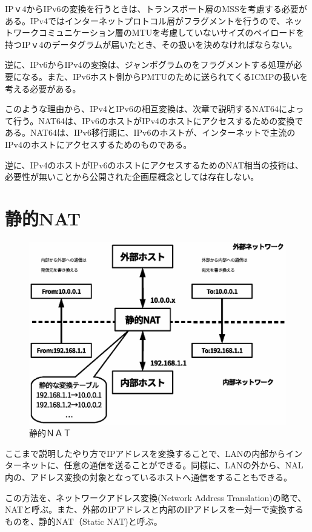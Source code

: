 IPｖ4からIPv6の変換を行うときは、トランスポート層のMSSを考慮する必要がある。IPv4ではインターネットプロトコル層がフラグメントを行うので、ネットワークコミュニケーション層のMTUを考慮していないサイズのペイロードを持つIPｖ4のデータグラムが届いたとき、その扱いを決めなければならない。

逆に、IPv6からIPv4の変換は、ジャンボグラムのをフラグメントする処理が必要になる。また、IPv6ホスト側からPMTUのために送られてくるICMPの扱いを考える必要がある。

このような理由から、IPv4とIPv6の相互変換は、次章で説明するNAT64によって行う。NAT64は、IPv6のホストがIPv4のホストにアクセスするための変換である。NAT64は、IPv6移行期に、IPv6のホストが、インターネットで主流のIPv4のホストにアクセスするためのものである。

逆に、IPv4のホストがIPv6のホストにアクセスするためのNAT相当の技術は、必要性が無いことから公開された企画屋概念としては存在しない。


\section{静的NAT}

\begin{figure}[htbp]
	\includegraphics[width=12cm,clip]{draw/fig7.eps}
	\caption{静的ＮＡＴ}
	\label{fig:static-nat}
\end{figure}

ここまで説明したやり方でIPアドレスを変換することで、LANの内部からインターネットに、任意の通信を送ることができる。同様に、LANの外から、NAL内の、アドレス変換の対象となっているホストへ通信をすることもできる。

この方法を、ネットワークアドレス変換(Network Address Translation)の略で、NATと呼ぶ。また、外部のIPアドレスと内部のIPアドレスを一対一で変換するものを、静的NAT（Static NAT)と呼ぶ。

